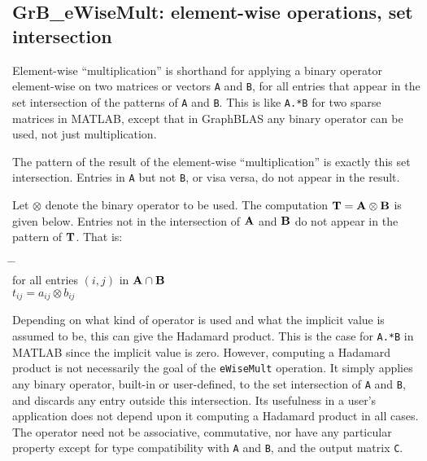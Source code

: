 \documentclass[12pt]{article}
\begin{document}
{\newpage
\subsection{{\sf GrB\_eWiseMult:} element-wise operations, set intersection} %
\label{eWiseMult}

Element-wise ``multiplication'' is shorthand for applying a binary operator
element-wise on two matrices or vectors \verb'A' and \verb'B', for all entries
that appear in the set intersection of the patterns of \verb'A' and \verb'B'.
This is like \verb'A.*B' for two sparse matrices in MATLAB, except that in
GraphBLAS any binary operator can be used, not just multiplication.

The pattern of the result of the element-wise ``multiplication'' is exactly
this set intersection.  Entries in \verb'A' but not \verb'B', or visa versa, do
not appear in the result.

Let $\otimes$ denote the binary operator to be used.  The computation ${\bf T =
A \otimes B}$ is given below.  Entries not in the intersection of ${\bf A}$ and
${\bf B}$ do not appear in the pattern of ${\bf T}$.  That is:
    \vspace{-0.2in}
    {\small
    \begin{tabbing}
    \hspace{2em} \= \hspace{2em} \= \hspace{2em} \= \\
    \> for all entries $(i,j)$ in ${\bf A \cap B}$ \\
    \> \> $t_{ij} = a_{ij} \otimes b_{ij}$ \\
    \end{tabbing} }
    \vspace{-0.2in}

Depending on what kind of operator is used and what the implicit value is
assumed to be, this can give the Hadamard product.  This is the case for
\verb'A.*B' in MATLAB since the implicit value is zero.  However, computing a
Hadamard product is not necessarily the goal of the \verb'eWiseMult' operation.
It simply applies any binary operator, built-in or user-defined, to the set
intersection of \verb'A' and \verb'B', and discards any entry outside this
intersection.  Its usefulness in a user's application does not depend upon it
computing a Hadamard product in all cases.  The operator need not be
associative, commutative, nor have any particular property except for type
compatibility with \verb'A' and \verb'B', and the output matrix \verb'C'.

}
\end{document}
